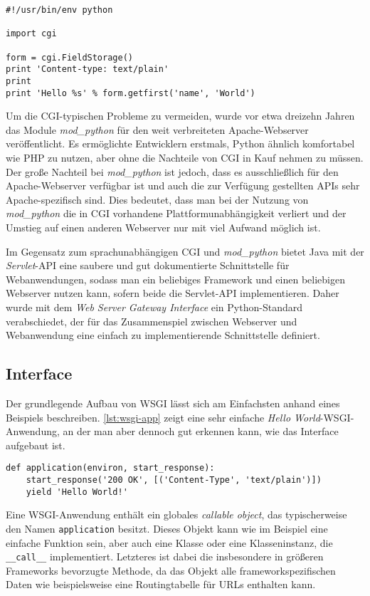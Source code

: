 \begin{lstlisting}[caption=Python-CGI-Script,label=lst:python-cgi]
#!/usr/bin/env python

import cgi

form = cgi.FieldStorage()
print 'Content-type: text/plain'
print
print 'Hello %s' % form.getfirst('name', 'World')
\end{lstlisting}

Um die CGI-typischen Probleme zu vermeiden, wurde vor etwa dreizehn Jahren das Module
\emph{mod\_python} für den weit verbreiteten Apache-Webserver veröffentlicht. Es ermöglichte
Entwicklern erstmals, Python ähnlich komfortabel wie PHP zu nutzen, aber ohne die Nachteile von CGI
in Kauf nehmen zu müssen. Der große Nachteil bei \emph{mod\_python} ist jedoch, dass es
ausschließlich für den Apache-Webserver verfügbar ist und auch die zur Verfügung gestellten APIs
sehr Apache-spezifisch sind. Dies bedeutet, dass man bei der Nutzung von \emph{mod\_python} die in
CGI vorhandene Plattformunabhängigkeit verliert und der Umstieg auf einen anderen Webserver nur mit
viel Aufwand möglich ist.

Im Gegensatz zum sprachunabhängigen CGI und \emph{mod\_python} bietet Java mit der \emph{Servlet}-API
eine saubere und gut dokumentierte Schnittstelle für Webanwendungen, sodass man ein beliebiges
Framework und einen beliebigen Webserver nutzen kann, sofern beide die Servlet-API implementieren.
Daher wurde mit dem \emph{Web Server Gateway Interface} ein Python-Standard verabschiedet, der für
das Zusammenspiel zwischen Webserver und Webanwendung eine einfach zu implementierende Schnittstelle
definiert.


\subsection{Interface}\label{wsgi-interface}

Der grundlegende Aufbau von WSGI lässt sich am Einfachsten anhand eines Beispiels beschreiben.
\autoref{lst:wsgi-app} zeigt eine sehr einfache \emph{Hello World}-WSGI-Anwendung, an der man aber
dennoch gut erkennen kann, wie das Interface aufgebaut ist.

\begin{lstlisting}[caption=Einfache WSGI-Applikation,label=lst:wsgi-app]
def application(environ, start_response):
    start_response('200 OK', [('Content-Type', 'text/plain')])
    yield 'Hello World!'
\end{lstlisting}

Eine WSGI-Anwendung enthält ein globales \emph{callable object}, das typischerweise den Namen
\lstinline{application} besitzt. Dieses Objekt kann wie im Beispiel eine einfache Funktion sein,
aber auch eine Klasse oder eine Klasseninstanz, die \lstinline{__call__} implementiert. Letzteres
ist dabei die insbesondere in größeren Frameworks bevorzugte Methode, da das Objekt alle
frameworkspezifischen Daten wie beispielsweise eine Routingtabelle für URLs enthalten kann.

